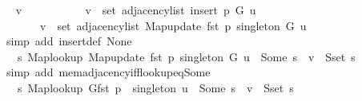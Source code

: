 \begin{isabellebody}
\ \isamarkupfalse%
\ v\isanewline
\ \ \ \ \isamarkupfalse%
\isanewline
\ \ \ \ \ \ {\isachardoublequoteopen}v\ {\isasymin}\ set\ {\isacharparenleft}{\kern0pt}adjacency{\isacharunderscore}{\kern0pt}list\ {\isacharparenleft}{\kern0pt}insert\ p\ G{\isacharparenright}{\kern0pt}\ u{\isacharparenright}{\kern0pt}\ {\isasymlongleftrightarrow}\isanewline
\ \ \ \ \ \ \ v\ {\isasymin}\ set\ {\isacharparenleft}{\kern0pt}adjacency{\isacharunderscore}{\kern0pt}list\ {\isacharparenleft}{\kern0pt}Map{\isacharunderscore}{\kern0pt}update\ {\isacharparenleft}{\kern0pt}fst\ p{\isacharparenright}{\kern0pt}\ {\isacharquery}{\kern0pt}singleton\ G{\isacharparenright}{\kern0pt}\ u{\isacharparenright}{\kern0pt}{\isachardoublequoteclose}\isanewline
\ \ \ \ \ \ \isamarkupfalse%
\ {\isacharparenleft}{\kern0pt}simp\ add{\isacharcolon}{\kern0pt}\ insert{\isacharunderscore}{\kern0pt}def\ None{\isacharparenright}{\kern0pt}\isanewline
\ \ \ \ \isamarkupfalse%
\ \isamarkupfalse%
\ {\isachardoublequoteopen}{\isachardot}{\kern0pt}{\isachardot}{\kern0pt}{\isachardot}{\kern0pt}\ {\isasymlongleftrightarrow}\ {\isacharparenleft}{\kern0pt}{\isasymexists}s{\isachardot}{\kern0pt}\ Map{\isacharunderscore}{\kern0pt}lookup\ {\isacharparenleft}{\kern0pt}Map{\isacharunderscore}{\kern0pt}update\ {\isacharparenleft}{\kern0pt}fst\ p{\isacharparenright}{\kern0pt}\ {\isacharquery}{\kern0pt}singleton\ G{\isacharparenright}{\kern0pt}\ u\ {\isacharequal}{\kern0pt}\ Some\ s\ {\isasymand}\ v\ {\isasymin}\ S{\isachardot}{\kern0pt}set\ s{\isacharparenright}{\kern0pt}{\isachardoublequoteclose}\isanewline
\ \ \ \ \ \ \isamarkupfalse%
\ {\isacharparenleft}{\kern0pt}simp\ add{\isacharcolon}{\kern0pt}\ mem{\isacharunderscore}{\kern0pt}adjacency{\isacharunderscore}{\kern0pt}iff{\isacharunderscore}{\kern0pt}lookup{\isacharunderscore}{\kern0pt}eq{\isacharunderscore}{\kern0pt}Some{\isacharparenright}{\kern0pt}\isanewline
\ \ \ \ \isamarkupfalse%
\ \isamarkupfalse%
\ {\isachardoublequoteopen}{\isachardot}{\kern0pt}{\isachardot}{\kern0pt}{\isachardot}{\kern0pt}\ {\isasymlongleftrightarrow}\ {\isacharparenleft}{\kern0pt}{\isasymexists}s{\isachardot}{\kern0pt}\ {\isacharparenleft}{\kern0pt}Map{\isacharunderscore}{\kern0pt}lookup\ G{\isacharparenleft}{\kern0pt}fst\ p\ {\isasymmapsto}\ {\isacharquery}{\kern0pt}singleton{\isacharparenright}{\kern0pt}{\isacharparenright}{\kern0pt}\ u\ {\isacharequal}{\kern0pt}\ Some\ s\ {\isasymand}\ v\ {\isasymin}\ S{\isachardot}{\kern0pt}set\ s{\isacharparenright}{\kern0pt}{\isachardoublequoteclose}\isanewline

\end{isabellebody}
